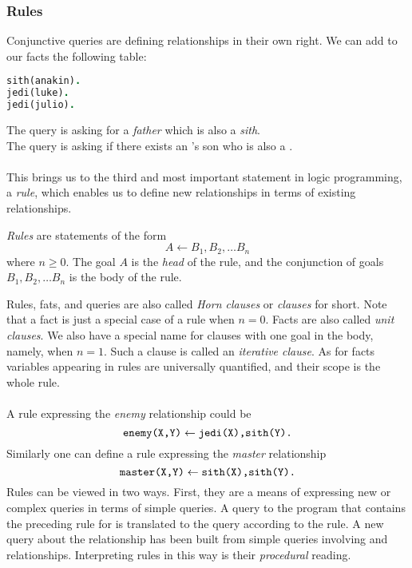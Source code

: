 \subsubsection{Rules}
Conjunctive queries are defining relationships in their own right. We can add to our facts the following table:
\begin{lstlisting}[language=Prolog, caption=Force-Side Relationship]
sith(anakin).
jedi(luke).
jedi(julio).
\end{lstlisting}
The query  is asking for a \textit{father} which is also a \textit{sith}.\\
The query  is asking if there exists an 's son who is also a .\\\\
This brings us to the third and most important statement in logic programming, a \textit{rule}, which enables us to define new relationships in terms of existing relationships.
\pagebreak
\begin{definition*}[Rules]
	\textit{Rules} are statements of the form $$A \leftarrow B_1, B_2, \ldots B_n$$ where $n \geq 0$.
	The goal $A$ is the \textit{head} of the rule, and the conjunction of goals $B_1, B_2, \ldots B_n$ is the body of the rule.
\end{definition*}
Rules, fats, and queries are also called \textit{Horn clauses} or \textit{clauses} for short. Note that a fact is just a special case of a rule when $n = 0$. Facts are also called \textit{unit clauses}. We also have a special name for clauses with one goal in the body, namely, when $n = 1$. Such a clause is called an \textit{iterative clause}. As for facts variables appearing in rules are universally quantified, and their scope is the whole rule.\\\\
A rule expressing the \textit{enemy} relationship could be
\begin{equation*}
	\texttt{enemy(X,Y)} \leftarrow \texttt{jedi(X),sith(Y).}
\end{equation*}
Similarly one can define a rule expressing the \textit{master} relationship
\begin{equation*}
	\texttt{master(X,Y)} \leftarrow \texttt{sith(X),sith(Y).}
\end{equation*}
Rules can be viewed in two ways. First, they are a means of expressing new or complex queries in terms of simple queries. A query  to the program that contains the preceding rule for  is translated to the query  according to the rule. A new query about the  relationship has been built from simple queries involving  and  relationships. Interpreting rules in this way is their \textit{procedural} reading.\\\\
